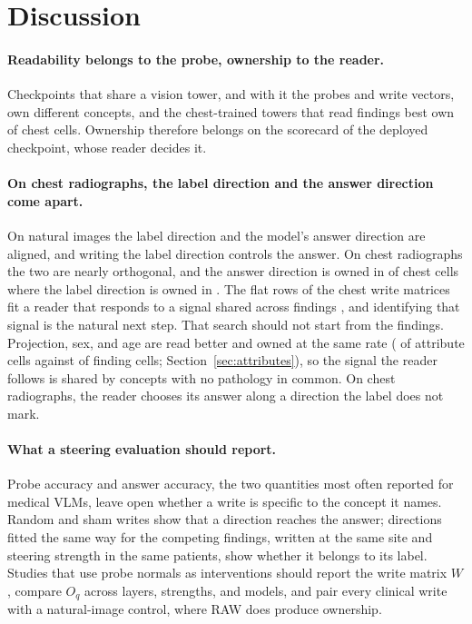 \section{Discussion}
\label{sec:implications}

\paragraph{Readability belongs to the probe, ownership to the reader.}
Checkpoints that share a vision tower, and with it the probes and write vectors, own different concepts, and the chest-trained towers that read findings best own \cfSpecTowerOwned{} of \cfSpecTowerN{} chest cells. Ownership therefore belongs on the scorecard of the deployed checkpoint, whose reader decides it.

\paragraph{On chest radiographs, the label direction and the answer direction come apart.}
On natural images the label direction and the model's answer direction are aligned, and writing the label direction controls the answer. On chest radiographs the two are nearly orthogonal, and the answer direction is owned in \cfAnsChestOwnedA{} of \cfAnsChestN{} chest cells where the label direction is owned in \cfAnsChestOwnedLabel{}. The flat rows of the chest write matrices fit a reader that responds to a signal shared across findings \citep{pahde2025navigating}, and identifying that signal is the natural next step. That search should not start from the findings. Projection, sex, and age are read better and owned at the same rate (\cfAttrAllAttrOwned{} of \cfAttrAllAttrN{} attribute cells against \cfAttrAllClinOwned{} of \cfAttrAllClinN{} finding cells; Section~\ref{sec:attributes}), so the signal the reader follows is shared by concepts with no pathology in common. On chest radiographs, the reader chooses its answer along a direction the label does not mark.

\paragraph{What a steering evaluation should report.}
Probe accuracy and answer accuracy, the two quantities most often reported for medical VLMs, leave open whether a write is specific to the concept it names. Random and sham writes show that a direction reaches the answer; directions fitted the same way for the competing findings, written at the same site and steering strength in the same patients, show whether it belongs to its label. Studies that use probe normals as interventions should report the write matrix $W$, compare $O_q$ across layers, strengths, and models, and pair every clinical write with a natural-image control, where RAW does produce ownership.
